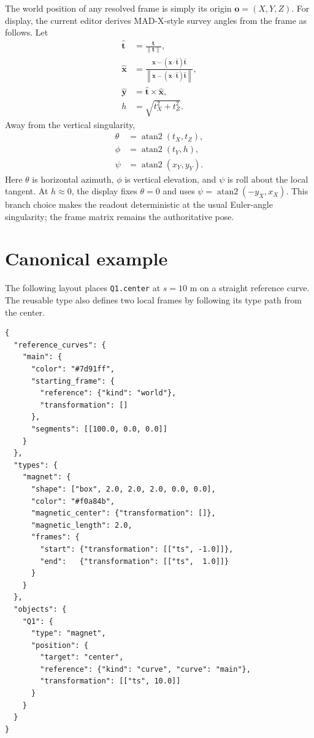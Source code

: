\documentclass[11pt,a4paper]{article}
\begin{document}
The world position of any resolved frame is simply its origin
$\mathbf{o}=(X,Y,Z)$.  For display, the current editor derives
MAD-X-style survey angles from the frame as follows.  Let
\begin{align}
 \widehat{\mathbf{t}}&=\frac{\mathbf{t}}{\lVert\mathbf{t}\rVert},\\
 \widehat{\mathbf{x}}&=
 \frac{\mathbf{x}-(\mathbf{x}\cdot\widehat{\mathbf{t}})
       \widehat{\mathbf{t}}}
      {\left\lVert\mathbf{x}-(\mathbf{x}\cdot\widehat{\mathbf{t}})
       \widehat{\mathbf{t}}\right\rVert},\\
 \widehat{\mathbf{y}}&=\widehat{\mathbf{t}}\times
                       \widehat{\mathbf{x}},\\
 h&=\sqrt{t_X^2+t_Z^2}.
\end{align}
Away from the vertical singularity,
\begin{align}
 \theta&=\operatorname{atan2}(t_X,t_Z),\\
 \phi&=\operatorname{atan2}(t_Y,h),\\
 \psi&=\operatorname{atan2}(x_Y,y_Y).
 \label{eq:madx-readout}
\end{align}
Here $\theta$ is horizontal azimuth, $\phi$ is vertical elevation, and $\psi$
is roll about the local tangent.  At $h\approx0$, the display fixes
$\theta=0$ and uses
$\psi=\operatorname{atan2}(-y_X,x_X)$.  This branch choice makes the readout
deterministic at the usual Euler-angle singularity; the frame matrix remains the
authoritative pose.

\section{Canonical example}

The following layout places \texttt{Q1.center} at $s=10$ m on a straight
reference curve.  The reusable type also defines two local frames by following
its type path from the center.

\begin{lstlisting}
{
  "reference_curves": {
    "main": {
      "color": "#7d91ff",
      "starting_frame": {
        "reference": {"kind": "world"},
        "transformation": []
      },
      "segments": [[100.0, 0.0, 0.0]]
    }
  },
  "types": {
    "magnet": {
      "shape": ["box", 2.0, 2.0, 2.0, 0.0, 0.0],
      "color": "#f0a84b",
      "magnetic_center": {"transformation": []},
      "magnetic_length": 2.0,
      "frames": {
        "start": {"transformation": [["ts", -1.0]]},
        "end":   {"transformation": [["ts",  1.0]]}
      }
    }
  },
  "objects": {
    "Q1": {
      "type": "magnet",
      "position": {
        "target": "center",
        "reference": {"kind": "curve", "curve": "main"},
        "transformation": [["ts", 10.0]]
      }
    }
  }
}
\end{lstlisting}
\end{document}
